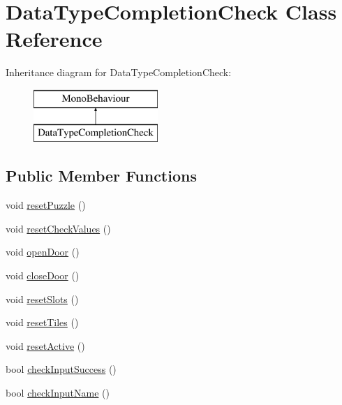 \hypertarget{class_data_type_completion_check}{}\section{Data\+Type\+Completion\+Check Class Reference}
\label{class_data_type_completion_check}
Inheritance diagram for Data\+Type\+Completion\+Check\+:\begin{figure}[H]
\begin{center}
\leavevmode
\includegraphics[height=2.000000cm]{class_data_type_completion_check}
\end{center}
\end{figure}
\subsection*{Public Member Functions}
\begin{DoxyCompactItemize}
\item 
void \hyperlink{class_data_type_completion_check_ad3f39d3c444a4c12d9be6d34301d205c}{reset\+Puzzle} ()
\item 
void \hyperlink{class_data_type_completion_check_a67f85080d0dffb91232071fb8309bb03}{reset\+Check\+Values} ()
\item 
void \hyperlink{class_data_type_completion_check_a9bd671a2b59b84e18d2edc73230f6685}{open\+Door} ()
\item 
void \hyperlink{class_data_type_completion_check_afcee752af57f3545637a47ed18dbb323}{close\+Door} ()
\item 
void \hyperlink{class_data_type_completion_check_a9da4ca7a2b766793c7bf5f58b0122353}{reset\+Slots} ()
\item 
void \hyperlink{class_data_type_completion_check_a809e4d0382491e248501c35998e92046}{reset\+Tiles} ()
\item 
void \hyperlink{class_data_type_completion_check_a815b17174f47c02a08e1e3442d895409}{reset\+Active} ()
\item 
bool \hyperlink{class_data_type_completion_check_ac2ed1c70356ebaf4db5ecb26edccda66}{check\+Input\+Success} ()
\item 
bool \hyperlink{class_data_type_completion_check_a508b3241c277e5fa65a9d9510f971946}{check\+Input\+Name} ()
\end{DoxyCompactItemize}
